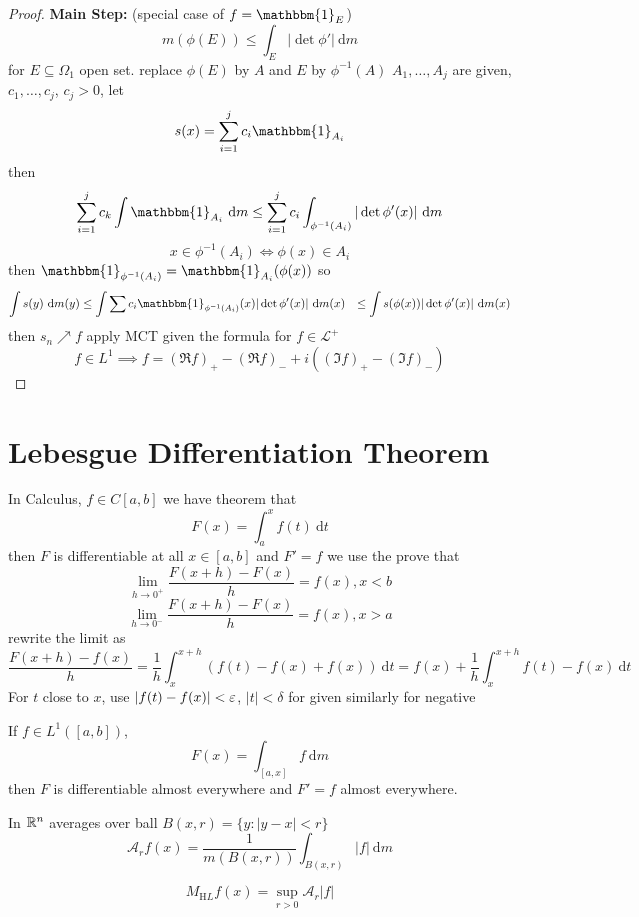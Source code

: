 \begin{proof}
  \textbf{Main Step:} (special case of $f = \mathbbm{1}_E$)
  \[m(\phi(E)) \le \int_E |\det \phi'| \ \mathrm{d}m\]
  for $E \subseteq \Omega_1$ open set.
  replace $\phi(E)$ by $A$ and $E$ by $\phi^{-1}(A)$
  $A_1, \dotsc, A_j$ are given, $c_1, \dotsc, c_j$, $c_j > 0$,
  let 
  \[s(x) = \sum_{i=1}^j c_i \mathbbm{1}_{A_i}\]
  then
  \begin{align*}
    \sum_{i=1}^j c_k \int \mathbbm{1}_{A_i} \ \mathrm{d}m \le \sum_{i=1}^j c_i \int_{\phi^{-1}(A_i)} |\det \phi'(x)| \ \mathrm{d}m
  \end{align*}
  \[x \in \phi^{-1}(A_i) \iff \phi(x) \in A_i\]
  then $\mathbbm{1}_{\phi^{-1}(A_i)} = \mathbbm{1}_{A_i} (\phi(x))$
  so
  \begin{align*}
    \int s(y) \ \mathrm{d}m(y) &\le \int \sum c_i \mathbbm{1}_{\phi^{-1}(A_i)}(x) |\det \phi'(x)| \ \mathrm{d}m(x)
    &\le \int s(\phi(x)) |\det \phi'(x)| \ \mathrm{d}m(x)
  \end{align*}
  then $s_n \nearrow f$ apply MCT given the formula for $f \in \mathcal{L}^+$
  \[f \in L^1 \implies f = (\Re f)_+ - (\Re f)_- + i((\Im f)_+ - (\Im f)_-)\]
\end{proof}

\section{Lebesgue Differentiation Theorem}

In Calculus, $f \in C[a, b]$
we have theorem that 
\[F(x) = \int_a^x f(t) \ \mathrm{d}t\]
then $F$ is differentiable at all $x \in [a, b]$ and $F' = f$
we use the prove that
\[\lim_{h \to 0^+} \frac{F(x+h) - F(x)}{h} = f(x), x < b\]
\[\lim_{h \to 0^-} \frac{F(x+h) - F(x)}{h} = f(x), x > a\]
rewrite the limit as 
\[\frac{F(x+h) - f(x)}h = \frac1h \int_x^{x+h} (f(t) - f(x) + f(x)) \ \mathrm{d}t = f(x) + \frac1h\int_x^{x+h}f(t) - f(x) \ \mathrm{d}t\]
For $t$ close to $x$, use $|f(t) - f(x)| < \varepsilon$, $|t| < \delta$ for given
similarly for negative

\begin{theorem}
  If $f \in L^1([a, b])$,
  \[F(x) = \int_{[a, x]} f \ \mathrm{d}m\]
  then $F$ is differentiable almost everywhere and $F' = f$ almost everywhere.
\end{theorem}
\begin{definition}
  In $\mathbb R^n$ averages over ball $B(x, r) = \{y : |y-x| < r\}$
  \[\mathcal{A}_r f(x) = \frac{1}{m(B(x, r))} \int_{B(x, r)} |f| \ \mathrm{d}m\]
\end{definition}
\begin{definition}
  \[M_{\mathrm HL}f(x) = \sup_{r > 0} \mathcal{A}_r |f|\] 
\end{definition}

